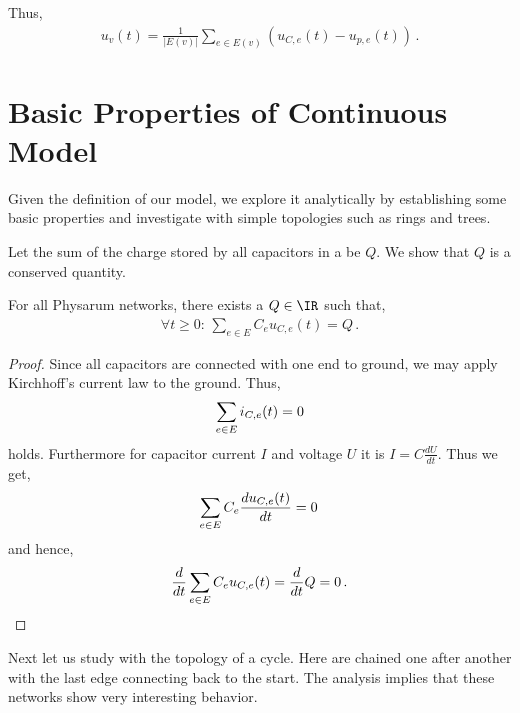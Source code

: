 Thus,
\begin{align}
  u_v(t) = \frac{1}{|E(v)|}\sum_{e \in E(v)}(u_{C,e}(t)-u_{p,e}(t))\,.\label{eq:uv}
\end{align}


\section{Basic Properties of Continuous Model}\label{sec:basic_cont}

  Given the definition of our model, we explore it analytically by establishing some basic properties and investigate \Pns with simple topologies such as rings and trees.

  Let the sum of the charge stored by all capacitors in a \Pn be $Q$. We show that $Q$ is a conserved quantity.

\begin{lem}\label{lem:inv_cont}
For all Physarum networks, there exists a $Q \in \IR$ such that,
\begin{align}
\forall t\ge 0:\,\sum_{e \in E}C_e u_{C,e}(t) = Q\,.
\end{align}
\end{lem}
\begin{proof}
Since all capacitors are connected with one end to ground, we may apply Kirchhoff's current law to the ground.
Thus,  
\begin{align}
\sum_{e \in E}i_{C,e}(t) = 0\notag
\end{align}
holds. Furthermore for capacitor current $I$ and voltage $U$ it is $I= C \frac{dU}{dt}$. Thus we get,
\begin{align}
\sum_{e \in E}C_e\frac{du_{C,e}(t)}{dt} = 0\,\notag
\end{align}
and hence,
\begin{align}
\frac{d}{dt}\sum_{e \in E}C_eu_{C,e}(t) = \frac{d}{dt} Q = 0\,.\notag
\end{align}
\end{proof}

Next let us study \Pns with the topology of a cycle. Here \Pes are chained one after another with the last edge connecting back to the start. The analysis implies that these networks show very interesting behavior. 

